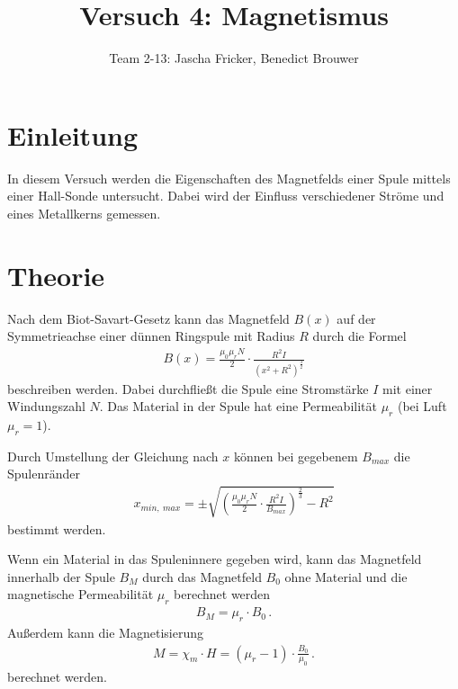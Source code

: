 \documentclass[11pt, a4paper]{article}
\title{Versuch 4: Magnetismus}
\author{Team 2-13: Jascha Fricker, Benedict Brouwer}
\begin{document}
    \maketitle

    \tableofcontents

    \newpage

    \section{Einleitung}

    In diesem Versuch werden die Eigenschaften des Magnetfelds einer Spule mittels einer Hall-Sonde untersucht. Dabei wird der Einfluss verschiedener Ströme und eines Metallkerns gemessen.

    \section{Theorie}

    Nach dem Biot-Savart-Gesetz kann das Magnetfeld $B(x)$ auf der Symmetrieachse einer dünnen Ringspule mit Radius $R$ durch die Formel
    \begin{align}
        B(x) = \frac{\mu_0 \mu_r N}{2} \cdot \frac{R^2 I}{\left(x^2 + R^2\right)^{\frac{3}{2}}} \label{eq:BiotSavart}
    \end{align}
    beschreiben werden. Dabei durchfließt die Spule eine Stromstärke $I$ mit einer Windungszahl $N$. Das Material in der Spule hat eine Permeabilität $\mu_r$ (bei Luft $\mu_r = 1$).
    
    Durch Umstellung der Gleichung nach $x$ können bei gegebenem $B_{max}$ die Spulenränder
    \begin{align}
        x_{min, \ max} = \pm \sqrt{\left(\frac{\mu_0 \mu_r N}{2} \cdot \frac{R^2 I}{B_{max}}\right)^\frac{2}{3} - R^2} \label{eq:bmax}
    \end{align}
    bestimmt werden.
    
    Wenn ein Material in das Spuleninnere gegeben wird, kann das Magnetfeld innerhalb der Spule $B_M$ durch das Magnetfeld $B_0$ ohne Material und die magnetische Permeabilität $\mu_r$ berechnet werden
    \begin{align}
        B_M = \mu_r \cdot B_0 \,. \label{eq:B_M}
    \end{align}
    Außerdem kann die Magnetisierung
    \begin{align}
        M = \chi_m \cdot H = (\mu_r - 1) \cdot \frac{B_0}{\mu_0} \,. \label{eq:magnet}
    \end{align}
    berechnet werden.
\end{document}
